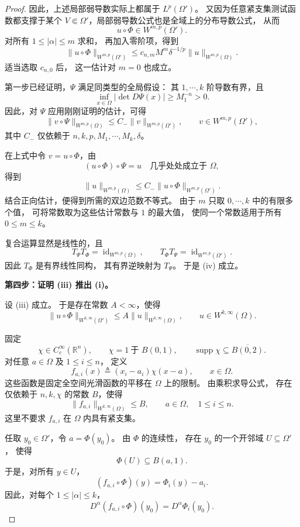 \documentclass[../../main.tex]{subfiles}%
\begin{document}
\begin{proof}
因此，上述局部弱导数实际上都属于
$L^p(\Omega')$。
又因为任意紧支集测试函数都支撑于某个
$V\Subset\Omega'$，局部弱导数公式也是全域上的分布导数公式，
从而
\[
u\circ\Phi\in W^{m,p}(\Omega').
\]
对所有 $1\leqslant|\alpha|\leqslant m$ 求和，
再加入零阶项，得到
\[
\|u\circ\Phi\|_{W^{m,p}(\Omega')}
\leqslant
c_{n,m}M^m\delta^{-1/p}
\|u\|_{W^{m,p}(\Omega)}.
\]
适当选取 $c_{n,0}$ 后，
这一估计对 $m=0$ 也成立。

第一步已经证明，$\Psi$ 满足同类型的全局假设：
其 $1,\cdots,k$ 阶导数有界，且
\[
\inf_{x\in\Omega}|\det D\Psi(x)|\geqslant M_1^{-n}>0.
\]
因此，对 $\Psi$ 应用刚刚证明的估计，可得
\[
\|v\circ\Psi\|_{W^{m,p}(\Omega)}
\leqslant
C_-\|v\|_{W^{m,p}(\Omega')},
\qquad v\in W^{m,p}(\Omega'),
\]
其中 $C_-$ 仅依赖于
$n,k,p,M_1,\cdots,M_k,\delta$。

在上式中令 $v=u\circ\Phi$，由
\[
(u\circ\Phi)\circ\Psi=u
\quad\text{几乎处处成立于 }\Omega,
\]
得到
\[
\|u\|_{W^{m,p}(\Omega)}
\leqslant
C_-\|u\circ\Phi\|_{W^{m,p}(\Omega')}.
\]
结合正向估计，便得到所需的双边范数不等式。
由于 $m$ 只取 $0,\cdots,k$ 中的有限多个值，
可将常数取为这些估计常数与 $1$ 的最大值，
使同一个常数适用于所有 $0\leqslant m\leqslant k$。

复合运算显然是线性的，且
\[
T_\Psi T_\Phi=\operatorname{id}_{W^{m,p}(\Omega)},
\qquad
T_\Phi T_\Psi=\operatorname{id}_{W^{m,p}(\Omega')}.
\]
因此 $T_\Phi$ 是有界线性同构，
其有界逆映射为 $T_\Psi$。
于是 \textup{(iv)} 成立。

\medskip
\noindent
\textbf{第四步：证明 \textup{(iii)} 推出 \textup{(i)}。}

设 \textup{(iii)} 成立。
于是存在常数 $A<\infty$，使得
\[
\|u\circ\Phi\|_{W^{k,\infty}(\Omega')}
\leqslant
A\|u\|_{W^{k,\infty}(\Omega)},
\qquad u\in W^{k,\infty}(\Omega).
\]

固定
\[
\chi\in C_c^\infty(\mathbb{R}^n),
\qquad
\chi=1\ \text{于 }B(0,1),
\qquad
\operatorname{supp}\chi\subseteq\overline{B(0,2)}.
\]
对任意 $a\in\Omega$ 及 $1\leqslant i\leqslant n$，
定义
\[
f_{a,i}(x)\triangleq(x_i-a_i)\chi(x-a),
\qquad x\in\Omega.
\]
这些函数是固定全空间光滑函数的平移在 $\Omega$ 上的限制。
由乘积求导公式，
存在仅依赖于 $n,k,\chi$ 的常数 $B$，使得
\[
\|f_{a,i}\|_{W^{k,\infty}(\Omega)}
\leqslant B,
\qquad a\in\Omega,\quad 1\leqslant i\leqslant n.
\]
这里不要求 $f_{a,i}$ 在 $\Omega$ 内具有紧支集。

任取 $y_0\in\Omega'$，令 $a=\Phi(y_0)$。
由 $\Phi$ 的连续性，
存在 $y_0$ 的一个开邻域 $U\subseteq\Omega'$，
使得
\[
\Phi(U)\subseteq B(a,1).
\]
于是，对所有 $y\in U$，
\[
(f_{a,i}\circ\Phi)(y)=\Phi_i(y)-a_i.
\]
因此，对每个 $1\leqslant|\alpha|\leqslant k$，
\[
D^\alpha(f_{a,i}\circ\Phi)(y_0)
=
D^\alpha\Phi_i(y_0).
\]


\end{proof}
\end{document}
